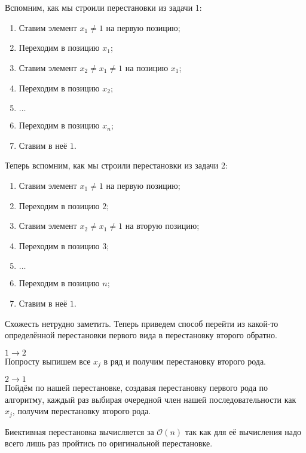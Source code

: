 \section{}
	Вспомним, как мы строили перестановки из задачи 1:
	\begin{enumerate}
		\item Ставим элемент $x_1\neq 1$ на первую позицию;
		\item Переходим в позицию $x_1$;
		\item Ставим элемент $x_2 \neq x_1 \neq 1$ на позицию $x_1$;
		\item Переходим в позицию $x_2$;
		\item $\dotsc$
		\item Переходим в позицию $x_n$;
		\item Ставим в неё $1$. 
	\end{enumerate}

	Теперь вспомним, как мы строили перестановки из задачи 2:
	\begin{enumerate}
		\item Ставим элемент $x_1 \neq 1$ на первую позицию;
		\item Переходим в позицию $2$;
		\item Ставим элемент $x_2 \neq x_1 \neq 1$ на вторую позицию;
		\item Переходим в позицию $3$;
		\item $\dotsc$
		\item Переходим в позицию $n$;
		\item Ставим в неё $1$.
	\end{enumerate}

	Схожесть нетрудно заметить. Теперь приведем способ перейти из какой-то определённой перестановки первого вида в перестановку второго обратно.
	
	$1 \rightarrow 2$\\
	Попросту выпишем все $x_j$ в ряд и получим перестановку второго рода.
	
	$2 \rightarrow 1$\\
	Пойдём по нашей перестановке, создавая перестановку первого рода по алгоритму, каждый раз выбирая очередной член нашей последовательности как $x_j$, получим перестановку второго рода.
	
	Биективная перестановка вычисляется за $\mathcal{O}(n)$ так как для её вычисления надо всего лишь раз пройтись по оригинальной перестановке.